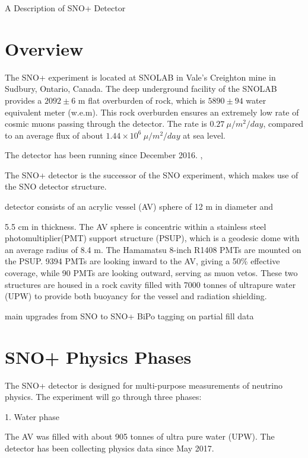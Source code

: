 
A Description of SNO+ Detector
\section{Overview}\label{overview}
The SNO+ experiment is located at SNOLAB in Vale's Creighton mine in Sudbury, Ontario, Canada. The deep underground facility of the SNOLAB provides a $2092\pm6$ m flat overburden of rock, which is $5890\pm94$ water equivalent meter (w.e.m). This rock overburden ensures an extremely low rate of cosmic muons passing through the detector. The rate is $0.27~\mu/m^2/day$, compared to an average flux of about $1.44\times 10^6~\mu/m^2/day$ at sea level\cite{muonflux}.

The detector has been running since December 2016.
\cite{anderson2019search},


The SNO+ detector is the successor of the SNO experiment, which makes use of the SNO detector structure. 


detector consists of an acrylic vessel (AV) sphere of 12 m in diameter and

5.5 cm in thickness. The AV sphere is concentric within a stainless steel photomultiplier(PMT) support structure (PSUP), which is a geodesic dome with an average radius of 8.4 m. The Hamamatsu 8-inch R1408 PMTs are mounted on the PSUP. 9394 PMTs are looking inward to the AV, giving a 50\% effective coverage, while 90 PMTs are looking outward, serving as muon vetos. These two structures are housed in a rock cavity filled with 7000 tonnes of ultrapure water (UPW) to provide both buoyancy for the vessel and radiation shielding.


main upgrades from SNO to SNO+
BiPo tagging on partial fill data

\section{SNO+ Physics Phases}
The SNO+ detector is designed for multi-purpose measurements of neutrino physics.
The experiment will go through three phases\cite{whitepaper}: 

1. Water phase 

The AV was filled with about 905 tonnes of ultra pure water (UPW). The detector has been collecting physics data since May 2017.

